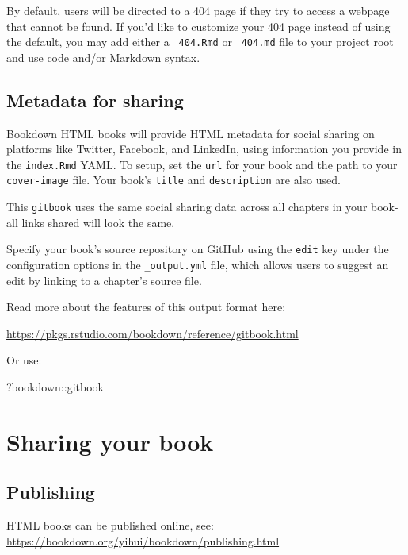 \documentclass[
]{book}
\newenvironment{Shaded}{\begin{snugshade}}{\end{snugshade}}
\newcommand{\NormalTok}[1]{#1}
\newcommand{\SpecialCharTok}[1]{\textcolor[rgb]{0.00,0.00,0.00}{#1}}
\begin{document}
By default, users will be directed to a 404 page if they try to access a webpage that cannot be found. If you'd like to customize your 404 page instead of using the default, you may add either a \texttt{\_404.Rmd} or \texttt{\_404.md} file to your project root and use code and/or Markdown syntax.

\hypertarget{metadata-for-sharing}{%
\section{Metadata for sharing}\label{metadata-for-sharing}}

Bookdown HTML books will provide HTML metadata for social sharing on platforms like Twitter, Facebook, and LinkedIn, using information you provide in the \texttt{index.Rmd} YAML. To setup, set the \texttt{url} for your book and the path to your \texttt{cover-image} file. Your book's \texttt{title} and \texttt{description} are also used.

This \texttt{gitbook} uses the same social sharing data across all chapters in your book- all links shared will look the same.

Specify your book's source repository on GitHub using the \texttt{edit} key under the configuration options in the \texttt{\_output.yml} file, which allows users to suggest an edit by linking to a chapter's source file.

Read more about the features of this output format here:

\url{https://pkgs.rstudio.com/bookdown/reference/gitbook.html}

Or use:

\begin{Shaded}
\begin{Highlighting}[]
\NormalTok{?bookdown}\SpecialCharTok{::}\NormalTok{gitbook}
\end{Highlighting}
\end{Shaded}

\hypertarget{sharing-your-book-1}{%
\chapter{Sharing your book}\label{sharing-your-book-1}}

\hypertarget{publishing-1}{%
\section{Publishing}\label{publishing-1}}

HTML books can be published online, see: \url{https://bookdown.org/yihui/bookdown/publishing.html}
\end{document}
